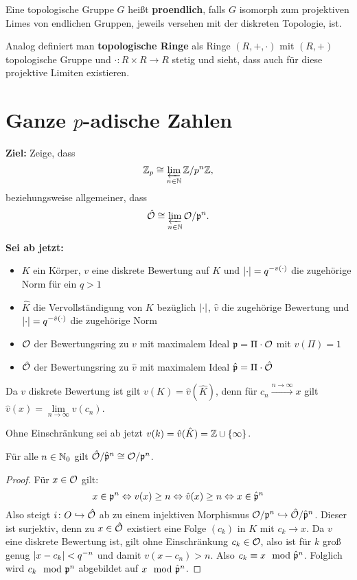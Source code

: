 \begin{defi}
Eine topologische Gruppe $G$ heißt \textbf{proendlich}, falls $G$ isomorph zum projektiven Limes von endlichen Gruppen, jeweils versehen mit der diskreten Topologie, ist.
\end{defi}

\begin{Bem}
Analog definiert man \textbf{topologische Ringe} als Ringe $(R,+,\cdot)$ mit $(R,+)$ topologische Gruppe und $\cdot \colon R\times R\to R$ stetig und sieht, dass auch für diese projektive Limiten existieren.
\end{Bem}



\section{Ganze $p$-adische Zahlen}

\textbf{Ziel:} Zeige, dass
\[ \mathbb{Z}_p \cong \varprojlim\limits_{n\in \mathbb{N}} \mathbb{Z} /p^n \mathbb{Z},
\]
beziehungsweise allgemeiner, dass
\[ \hat{\mathcal{O}} \cong \varprojlim\limits_{n\in\mathbb{N}} \mathcal{O} / \mathfrak{p}^n.
\]


\textbf{Sei ab jetzt:}
\begin{itemize}
\item $K$ ein Körper, $v$ eine diskrete Bewertung auf $K$ und $\left|{\cdot}\right| = q^{-v(\cdot)}$ die zugehörige Norm für ein $q>1$
\item $\hat{K}$ die Vervollständigung von $K$ bezüglich $\left|{\cdot}\right|$, $\hat{v}$ die zugehörige Bewertung und  $\left|{\cdot}\right| = q^{-\hat{v}(\cdot)}$ die zugehörige Norm
\item $\mathcal{O}$ der Bewertungsring zu $v$ mit maximalem Ideal $\mathfrak{p}= \Pi \cdot\mathcal{O}$ mit $v(\Pi)=1$
\item $\hat{\mathcal{O}}$ der Bewertungsring zu $\hat{v}$ mit maximalem Ideal $\hat{\mathfrak{p}}= \Pi \cdot\hat{\mathcal{O}}$
\end{itemize}


\begin{Bem}
Da $v$ diskrete Bewertung ist gilt $v(K)=\hat{v}(\hat{K})$, denn für $c_n \xrightarrow{n\to\infty}x$ gilt $\hat{v}(x) = \lim\limits_{n\to \infty} v(c_n)$.
\end{Bem}

Ohne Einschränkung sei ab jetzt $v(k) = \hat{v}(\hat{K}) = \mathbb{Z} \cup \{\infty \}$.


\begin{Prop}
Für alle $n\in\mathbb{N}_0$ gilt $\hat{\mathcal{O}} / \hat{\mathfrak{p}}^n \cong \mathcal{O} / \mathfrak{p}^n$.
\end{Prop}

\begin{proof}
Für $x \in \mathcal{O}$ gilt:
\[ x \in \mathfrak{p}^n \Leftrightarrow v(x) \geq n \Leftrightarrow \hat{v}(x) \geq n \Leftrightarrow x \in \hat{\mathfrak{p}}^n
\]
Also steigt $i \colon O \hookrightarrow \hat{\mathcal{O}}$ ab zu einem injektiven Morphismus
$\mathcal{O}/ \mathfrak{p}^n \hookrightarrow \hat{\mathcal{O}} / \hat{\mathfrak{p}}^n$. Dieser ist surjektiv, denn zu $x \in \hat{\mathcal{O}}$ existiert eine Folge $(c_k)$ in $K$ mit $c_k \to x$. Da $v$ eine diskrete Bewertung ist, gilt ohne Einschränkung $c_k \in \mathcal{O}$, also ist für $k$ groß genug $\left|{x-c_k}\right|<q^{-n}$ und damit $v(x-c_n)>n$.
Also $c_k \equiv x \mod \hat{\mathfrak{p}}^n$. Folglich wird $c_k \mod {\mathfrak{p}}^n$ abgebildet auf $x \mod \hat{\mathfrak{p}}^n$.
\end{proof}

